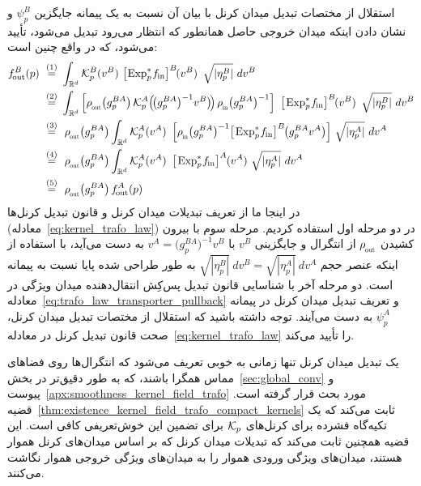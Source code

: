 استقلال از مختصات تبدیل میدان کرنل با بیان آن نسبت به یک پیمانه جایگزین $\psi_p^B$ و نشان دادن اینکه میدان خروجی حاصل همانطور که انتظار می‌رود تبدیل می‌شود، تأیید می‌شود، که در واقع چنین است:
\begin{align}\label{eq:kft_coordinate_independence}
	\fout^B(p)\ 
	\overset{(1)}{=}&\ 
	\int_{\R^d}
	\Kp^B(v^B) \ 
	\big[\mkern-2mu \Expspfin\big]^B \mkern-2mu(v^B) \,\ 
	\sqrt{|\eta_p^B|}\ dv^B
	\notag \\ 
	\overset{(2)}{=}&\ 
	\int_{\R^d}
	\Big[ \rhoout\big(g_p^{BA}\big)\, \Kp^A\pig(\! \big(g_p^{BA}\big)^{-1} v^B \big)\!\pig)\, \rhoin\big(g_p^{BA}\big)^{-1} \Big] \,\ 
	\big[\mkern-1mu \Expspfin\big]^B \mkern-2mu(v^B) \,\ 
	\sqrt{|\eta_p^B|}\ dv^B
	\notag \\ 
	\overset{(3)}{=}&\ \ 
	\rhoout\big(g_p^{BA}\big)
	\int_{\R^d}
	\Kp^A(v^A) \,\ 
	\Big[ \rhoin\big(g_p^{BA}\big)^{-1} \big[\mkern-1mu \Expspfin\big]^B \mkern-2mu \big( g_p^{BA} v^A\big) \Big] \ 
	\sqrt{|\eta_p^A|}\ dv^A
	\notag \\ 
	\overset{(4)}{=}&\ \ 
	\rhoout\big(g_p^{BA}\big)
	\int_{\R^d}
	\Kp^A(v^A) \,\ 
	\big[\mkern-1mu \Expspfin\big]^A \mkern-1mu (v^A) \ 
	\sqrt{|\eta_p^A|}\ dv^A
	\notag \\ 
	\overset{(5)}{=}&\ \ 
	\rhoout\big(g_p^{BA}\big) \, \fout^A(p)
\end{align}
در اینجا ما از تعریف تبدیلات میدان کرنل و قانون تبدیل کرنل‌ها (معادله~\eqref{eq:kernel_trafo_law}) در دو مرحله اول استفاده کردیم.
مرحله سوم با بیرون کشیدن $\rhoout$ از انتگرال و جایگزینی $v^B$ با $v^A = \big(g_p^{BA}\big)^{-1} v^B$ به دست می‌آید، با استفاده از اینکه عنصر حجم $\sqrt{|\eta_p^B|}\ dv^B = \sqrt{|\eta_p^A|}\ dv^A$ به طور طراحی شده پایا نسبت به پیمانه است.
دو مرحله آخر با شناسایی قانون تبدیل پس‌کِش انتقال‌دهنده میدان ویژگی در معادله~\eqref{eq:trafo_law_transporter_pullback} و تعریف تبدیل میدان کرنل در پیمانه $\psi_p^A$ به دست می‌آیند.
توجه داشته باشید که استقلال از مختصات تبدیل میدان کرنل، صحت قانون تبدیل کرنل در معادله~\eqref{eq:kernel_trafo_law} را تأیید می‌کند.

یک تبدیل میدان کرنل تنها زمانی به خوبی تعریف می‌شود که انتگرال‌ها روی فضاهای مماس همگرا باشند، که به طور دقیق‌تر در بخش~\ref{sec:global_conv} و پیوست~\ref{apx:smoothness_kernel_field_trafo} مورد بحث قرار گرفته است.
قضیه~\ref{thm:existence_kernel_field_trafo_compact_kernels} ثابت می‌کند که یک تکیه‌گاه فشرده برای کرنل‌های $\mathcal{K}_p$ برای تضمین این خوش‌تعریفی کافی است.
این قضیه همچنین ثابت می‌کند که تبدیلات میدان کرنل که بر اساس میدان‌های کرنل هموار هستند، میدان‌های ویژگی ورودی هموار را به میدان‌های ویژگی خروجی هموار نگاشت می‌کنند.












